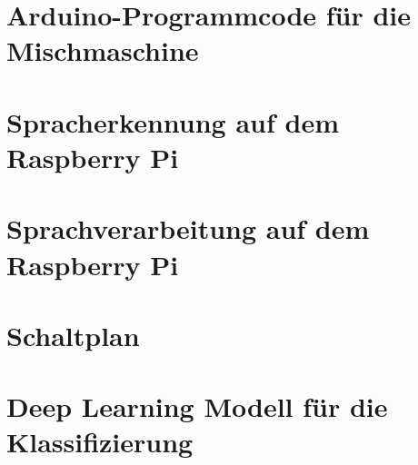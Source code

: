 \chapter{Arduino-Programmcode für die Mischmaschine}\label{Anhang_A}


\chapter{Spracherkennung auf dem Raspberry Pi}\label{Anhang_B}


\chapter{Sprachverarbeitung auf dem Raspberry Pi}\label{Anhang_C}

\chapter{Schaltplan}\label{Anhang_D}

\chapter{Deep Learning Modell für die Klassifizierung}\label{Anhang_E}
